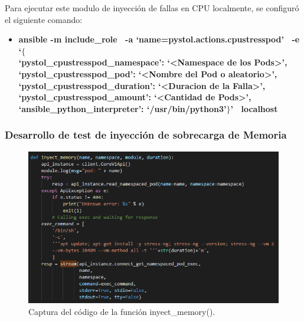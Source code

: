 \par Para ejecutar este modulo de inyección de fallas en CPU localmente, se configur\'o el siguiente comando:
\begin{itemize}
    \item \textbf{ansible -m include\_role \ -a `name=pystol.actions.cpustresspod' \ -e `$\{$ \\   
    `pystol\_cpustresspod\_namespace': `<Namespace de los Pods>',\\
    `pystol\_cpustresspod\_pod': `<Nombre del Pod o aleatorio>',\\
    `pystol\_cpustresspod\_duration': `<Duracion de la Falla>',\\
    `pystol\_cpustresspod\_amount': `<Cantidad de Pods>',\\
    `ansible\_python\_interpreter': `/usr/bin/python3'$\}$' \ localhost} %
\end{itemize}


\subsubsection{Desarrollo de test de inyección de sobrecarga de Memoria}

\begin{figure}[htpb!]
	\centering
	\includegraphics[width=0.95\columnwidth]{images/captures/codigo/Capture_inyect_memory.PNG}
	\caption{Captura del código de la función inyect\_memory().}
	\label{fig:codi04}
\end{figure}


